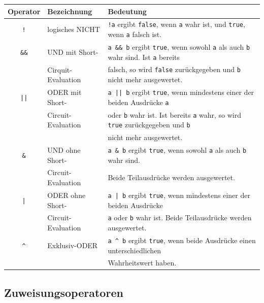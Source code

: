 \begin{tabular}{|c|l|l|}\hline
\textbf{Operator} & \textbf{Bezeichnung} & \textbf{Bedeutung}
\\ \hline
{\lstinline|!|} & logisches NICHT & {\lstinline|!a|} ergibt {\lstinline|false|},
wenn {\lstinline|a|} wahr ist, und {\lstinline|true|}, wenn {\lstinline|a|}
falsch ist.
\\ \hline
{\lstinline|&&|} & UND mit Short- &
{\lstinline|a && b|} ergibt {\lstinline|true|}, wenn sowohl {\lstinline|a|} als
auch {\lstinline|b|} wahr sind. Ist {\lstinline|a|} bereits\\
& Cirquit-Evaluation & falsch, so wird
{\lstinline|false|} zurückgegeben und {\lstinline|b|} nicht mehr ausgewertet.
\\ \hline
{\lstinline!||!} & ODER mit Short- &
{\lstinline!a || b!} ergibt {\lstinline!true!}, wenn mindestens einer der beiden
Ausdrücke {\lstinline!a!}\\
& Circuit-Evaluation & oder {\lstinline!b!} wahr ist. Ist bereits
{\lstinline!a!} wahr, so wird {\lstinline!true!} zurückgegeben und
{\lstinline!b!}\\
&& nicht mehr ausgewertet.
\\ \hline
{\lstinline!&!} & UND ohne Short- &
{\lstinline!a & b!} ergibt {\lstinline!true!}, wenn sowohl {\lstinline!a!} als
auch {\lstinline!b!} wahr sind.\\
{} & Circuit-Evaluation & Beide Teilausdrücke werden ausgewertet.
\\ \hline
{\lstinline!|!} &  ODER ohne Short- &
{\lstinline!a | b!} ergibt {\lstinline!true!}, wenn mindestens einer der beiden
Ausdrücke\\
& Circuit-Evaluation & {\lstinline!a!} oder {\lstinline!b!} wahr ist. Beide
Teilausdrücke werden ausgewertet.
\\ \hline
{\lstinline!^!} & Exklusiv-ODER & {\lstinline!a ^ b!} ergibt {\lstinline!true!},
wenn beide Ausdrücke einen unterschiedlichen\\
&& Wahrheitswert haben.
\\ \hline
\end{tabular}


\subsection{Zuweisungsoperatoren}

